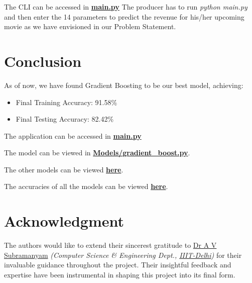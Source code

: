 \documentclass[conference]{IEEEtran}
\begin{document}
    The CLI can be accessed in \href{https://github.com/Vikranth3140/Movie-Revenue-Prediction/blob/main/main.py}{\textbf{main.py}}
    The producer has to run \textit{python main.py} and then enter the 14 parameters to predict the revenue for his/her upcoming movie as we have envisioned in our Problem Statement.

\section{Conclusion}
    As of now, we have found Gradient Boosting to be our best model, achieving:
    
    \begin{itemize}
        \item Final Training Accuracy: 91.58\%
        \item Final Testing Accuracy: 82.42\%
    \end{itemize}
    
    The application can be accessed in \href{https://github.com/Vikranth3140/Movie-Revenue-Prediction/blob/main/main.py}{\textbf{main.py}}
    
    The model can be viewed in \href{https://github.com/Vikranth3140/Movie-Revenue-Prediction/blob/main/models/gradient_boost.py}{\textbf{Models/gradient\_boost.py}}.
    
    The other models can be viewed \href{https://github.com/Vikranth3140/Movie-Revenue-Prediction/tree/main/models}{\textbf{here}}.
    
    The accuracies of all the models can be viewed \href{https://github.com/Vikranth3140/Movie-Revenue-Prediction/blob/main/models/accuracies.text}{\textbf{here}}.

\section*{Acknowledgment}
    The authors would like to extend their sincerest gratitude to \href{https://www.iiitd.ac.in/subramanyam}{Dr A V Subramanyam} \textit{(Computer Science \& Engineering Dept., \href{https://www.iiitd.ac.in/}{IIIT-Delhi})} for their invaluable guidance throughout the project.
    Their insightful feedback and expertise have been instrumental in shaping this project into its final form.
\end{document}
